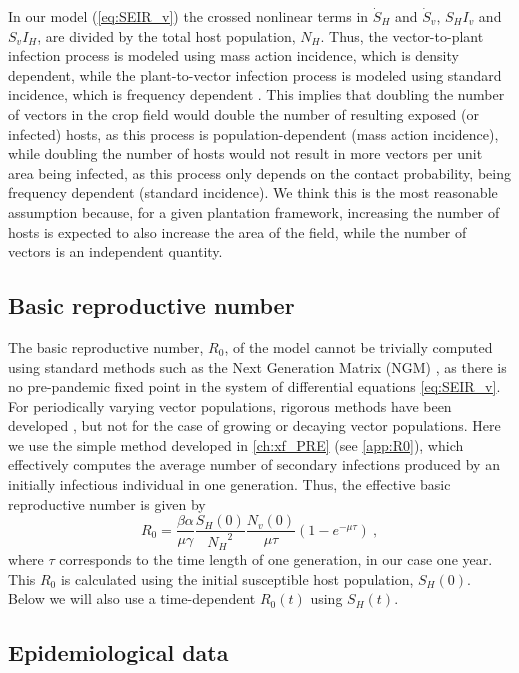 In our model (\cref{eq:SEIR_v}) the crossed nonlinear terms in $\dot{S}_H$
and $\dot{S}_v$, $S_H I_v$ and $S_v I_H$, are divided by the total host
population, $N_H$. Thus, the vector-to-plant infection process is modeled using
mass action incidence, which is density dependent, while the plant-to-vector
infection process is modeled using standard incidence, which is frequency
dependent \cite{MartchevaBook}. This implies that doubling the number of
vectors in the crop field would double the number of resulting exposed (or
infected) hosts, as this process is population-dependent (mass action
incidence), while doubling the number of hosts would not result in more vectors
per unit area being infected, as this process only depends on the contact
probability, being frequency dependent (standard incidence). We think this is
the most reasonable assumption because, for a given plantation framework,
increasing the number of hosts is expected to also increase the area of the
field, while the number of vectors is an independent quantity.

\subsection{Basic reproductive number}

The basic reproductive number, $R_0$, of the model cannot be trivially
computed using standard methods such as the Next Generation Matrix (NGM)
\cite{Diekmann2010}, as there is no pre-pandemic fixed point in the system of
differential equations \cref{eq:SEIR_v}. For periodically varying vector
populations, rigorous methods have been developed \cite{Bacaer2007}, but not
for the case of growing or decaying vector populations. Here we use the simple
method developed in \cref{ch:xf_PRE} \cite{GimenezRomero2022_PRE} (see
\cref{app:R0}), which
effectively computes the average number of secondary infections produced by an
initially infectious individual in one generation. Thus, the effective basic
reproductive number is given by
\begin{equation}\label{eq:R0}
    R_0=\frac{\beta\alpha}{\mu\gamma}\frac{S_H(0)}{{N_H}^2}
    \frac{N_v(0)}{\mu\tau}\left(1-e^{-\mu\tau}\right)
    \ ,
\end{equation}
where $\tau$ corresponds to the time length of one generation, in our case
one year. This $R_0$ is calculated using the initial susceptible host
population, $S_H(0)$. Below we will also use a time-dependent $R_0(t)$ using
$S_H(t)$.

\subsection{Epidemiological data}

